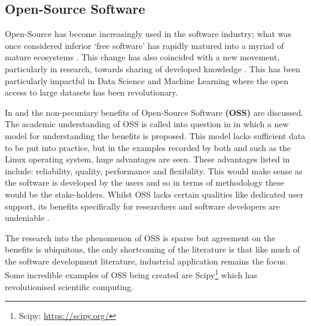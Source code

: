 \documentclass[hidelinks,journal]{IEEEtran}
\begin{document}
\subsection{Open-Source Software}
\label{subsec:lrOss}
Open-Source has become increasingly used in the software industry; what was once considered inferior ‘free software’ has rapidly matured into a myriad of mature ecosystems \parencite{Morgan07}. This change has also coincided with a new movement, particularly in research, towards sharing of developed knowledge \parencite{Sauer07}. This has been particularly impactful in Data Science and Machine Learning where the open access to large datasets has been revolutionary.

In \textcite{Sauer07} and \textcite{Morgan07} the non-pecuniary benefits of Open-Source Software \textbf{(OSS)} are discussed. The academic understanding of OSS is called into question in \textcite{Sauer07} in which a new model for understanding the benefits is proposed. This model lacks sufficient data to be put into practice, but in the examples recorded by both \textcite{Sauer07} and \textcite{Morgan07} such as the Linux operating system, huge advantages are seen. These advantages listed in \textcite{Morgan07} include: reliability, quality, performance and flexibility. This would make sense as the software is developed by the users and so in terms of methodology these would be the stake-holders. Whilst OSS lacks certain qualities like dedicated user support, its benefits specifically for researchers and software developers are undeniable \textcite{Sauer07}.

The research into the phenomenon of OSS is sparse but agreement on the benefits is ubiquitous, the only shortcoming of the literature is that like much of the software development literature, industrial application remains the focus. Some incredible examples of OSS being created are Scipy\footnote{Scipy: \url{https://scipy.org/}} which has revolutionised scientific computing.
\end{document}
